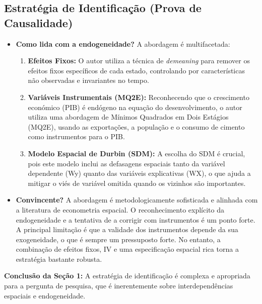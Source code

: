 \documentclass[12pt, a4paper]{article}
\begin{document}
\subsection{Estratégia de Identificação (Prova de Causalidade)}

\begin{itemize}
    \item \textbf{Como lida com a endogeneidade?} A abordagem é multifacetada:
        \begin{enumerate}
            \item \textbf{Efeitos Fixos:} O autor utiliza a técnica de \textit{demeaning} para remover os efeitos fixos específicos de cada estado, controlando por características não observadas e invariantes no tempo.
            \item \textbf{Variáveis Instrumentais (MQ2E):} Reconhecendo que o crescimento económico (PIB) é endógeno na equação do desenvolvimento, o autor utiliza uma abordagem de Mínimos Quadrados em Dois Estágios (MQ2E), usando as exportações, a população e o consumo de cimento como instrumentos para o PIB.
            \item \textbf{Modelo Espacial de Durbin (SDM):} A escolha do SDM é crucial, pois este modelo inclui as defasagens espaciais tanto da variável dependente (Wy) quanto das variáveis explicativas (WX), o que ajuda a mitigar o viés de variável omitida quando os vizinhos são importantes.
        \end{enumerate}

    \item \textbf{Convincente?} A abordagem é metodologicamente sofisticada e alinhada com a literatura de econometria espacial. O reconhecimento explícito da endogeneidade e a tentativa de a corrigir com instrumentos é um ponto forte. A principal limitação é que a validade dos instrumentos depende da sua exogeneidade, o que é sempre um pressuposto forte. No entanto, a combinação de efeitos fixos, IV e uma especificação espacial rica torna a estratégia bastante robusta.
\end{itemize}

\noindent\textbf{Conclusão da Seção 1:} A estratégia de identificação é complexa e apropriada para a pergunta de pesquisa, que é inerentemente sobre interdependências espaciais e endogeneidade.
\end{document}
